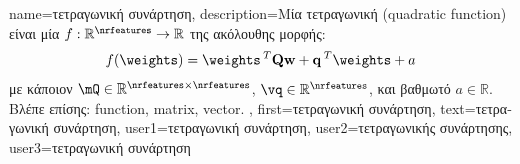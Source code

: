 {name={\foreignlanguage{greek}{τετραγωνική συνάρτηση}},
	description={\foreignlanguage{greek}{Μία τετραγωνική}  
		(quadratic function) \foreignlanguage{greek}{είναι μία}  
		$f: \mathbb{R}^{\nrfeatures} \rightarrow \mathbb{R}$ \foreignlanguage{greek}{της ακόλουθης μορφής}:  
		$$f(\weights) =  \weights\,^{T} \mathbf{Q} \mathbf{w} + \mathbf{q}\,^{T} \weights+a$$  
		\foreignlanguage{greek}{με κάποιον}  $\mQ \in \mathbb{R}^{\nrfeatures \times \nrfeatures}$, 
		 $\vq \in \mathbb{R}^{\nrfeatures}$, \foreignlanguage{greek}{και βαθμωτό} $a \in \mathbb{R}$. 
		\\
		\foreignlanguage{greek}{Βλέπε επίσης:} \gls{function}, \gls{matrix}, \gls{vector}. },
	first={\foreignlanguage{greek}{τετραγωνική συνάρτηση}},
	text={\foreignlanguage{greek}{τετραγωνική συνάρτηση}},
	user1={\foreignlanguage{greek}{τετραγωνική συνάρτηση}}, %
  	user2={\foreignlanguage{greek}{τετραγωνικής συνάρτησης}}, %
	user3={\foreignlanguage{greek}{τετραγωνική συνάρτηση}} %
}

